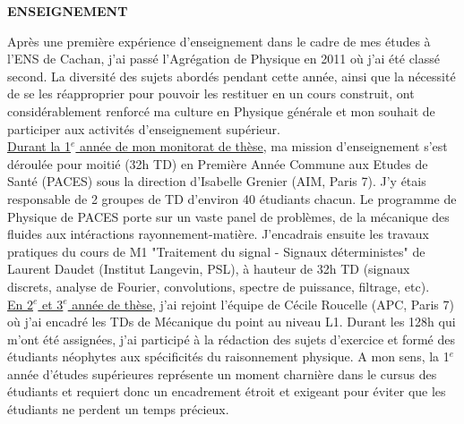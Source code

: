 \documentclass[11pt,onecolumn]{article}
\title{	
\vspace*{-2.5cm}
}
\author{\tiny} %
\date{\tiny }%
\begin{document}


\renewcommand{\headrulewidth}{1pt}
\pagestyle{fancy}
\fancyhf{}
\rhead{}
\rfoot{\thepage / \pageref{LastPage}}
\begin{center}
\Large \textbf{ENSEIGNEMENT}
\end{center}
\normalfont
\vspace*{-0.2cm}
\indent \indent Apr\`es une premi\`ere exp\'erience d'enseignement dans le cadre de mes \'etudes \`a l'ENS de Cachan, j'ai pass\'e l'Agr\'egation de Physique en 2011 o\`u j'ai \'et\'e class\'e second. La diversit\'e des sujets abord\'es pendant cette ann\'ee, ainsi que la n\'ecessit\'e de se les r\'eapproprier pour pouvoir les restituer en un cours construit, ont consid\'erablement renforc\'e ma culture en Physique g\'en\'erale et mon souhait de participer aux activit\'es d'enseignement sup\'erieur.\\
\indent \underline{Durant la 1$^{e}$ ann\'ee de mon monitorat de th\`ese}, ma mission d'enseignement s'est d\'eroul\'ee pour moiti\'e (32h TD) en Premi\`ere Ann\'ee Commune aux Etudes de Sant\'e (PACES) sous la direction d'Isabelle Grenier (AIM, Paris 7). J'y \'etais responsable de 2 groupes de TD d'environ 40 \'etudiants chacun. Le programme de Physique de PACES porte sur un vaste panel de probl\`emes, de la m\'ecanique des fluides aux int\'eractions rayonnement-mati\`ere. J'encadrais ensuite les travaux pratiques du cours de M1 "Traitement du signal - Signaux d\'eterministes" de Laurent Daudet (Institut Langevin, PSL), \`a hauteur de 32h TD (signaux discrets, analyse de Fourier, convolutions, spectre de puissance, filtrage, etc).\\
\indent \underline{En 2$^{e}$ et 3$^{e}$ année de thèse}, j'ai rejoint l'\'equipe de C\'ecile Roucelle (APC, Paris 7) o\`u j'ai encadr\'e les TDs de M\'ecanique du point au niveau L1. Durant les 128h qui m'ont \'et\'e assign\'ees, j'ai particip\'{e} \`a la r\'edaction des sujets d'exercice et form\'{e} des \'etudiants n\'eophytes aux sp\'ecificit\'es du raisonnement physique. A mon sens, la 1$^{e}$ ann\'ee d'\'etudes sup\'erieures repr\'esente un moment charni\`ere dans le cursus des \'etudiants et requiert donc un encadrement \'etroit et exigeant pour \'eviter que les \'etudiants ne perdent un temps pr\'ecieux.\\
\end{document}
